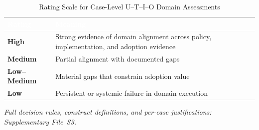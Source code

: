 
\begin{table}[H]
\caption{Rating Scale for Case-Level U--T--I--O Domain Assessments}
\label{tab:rating-scale}
\centering
\small
\renewcommand{\arraystretch}{1.35}
\setlength{\tabcolsep}{8pt}
\begin{tabular}{p{2.6cm} p{11.0cm}}
\toprule
\rowcolor{headerblue}
\textcolor{white}{\textbf{Rating}} &
\textcolor{white}{\textbf{Meaning}} \\
\midrule
\rowcolor{rowgray}
\textbf{High} & Strong evidence of domain alignment across policy, implementation, and adoption evidence \\
\textbf{Medium} & Partial alignment with documented gaps \\
\rowcolor{rowgray}
\textbf{Low--Medium} & Material gaps that constrain adoption value \\
\textbf{Low} & Persistent or systemic failure in domain execution \\
\bottomrule
\end{tabular}
\vspace{4pt}
{\footnotesize \textit{Full decision rules, construct definitions, and per-case justifications: Supplementary File~S3.}}
\end{table}
